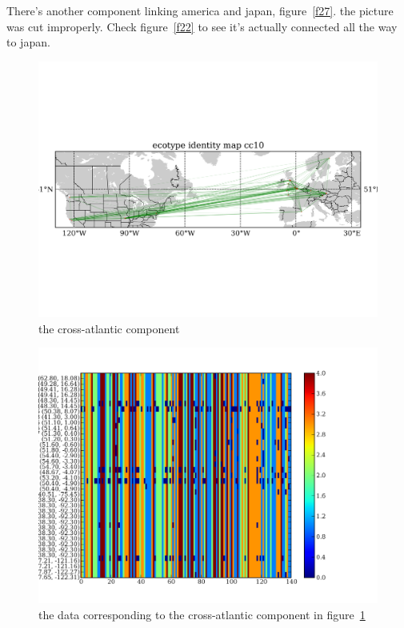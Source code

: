 \documentclass[a4paper,10pt]{article}
\begin{document}
There's another component linking america and japan, figure~\ref{f27}. the picture was cut improperly. Check figure~\ref{f22} to see it's actually connected all the way to japan.

\begin{figure}
\includegraphics[width=1\textwidth]{figures/ecotype_identity_cc10_site_network.png}
\caption{the cross-atlantic component}\label{f25}
\end{figure}

\begin{figure}
\includegraphics[width=1\textwidth]{figures/ecotype_identity_map_cc10.png}
\caption{the data corresponding to the cross-atlantic component in figure~\ref{f25}}\label{f26}
\end{figure}
\end{document}
